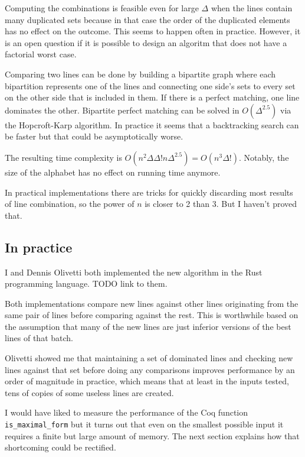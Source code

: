 \documentclass[english, 12pt, a4paper, sci, a-1b, online]{aaltothesis}
\newcommand\icoq[1]{\texttt{#1}}
\begin{document}
Computing the combinations is feasible even for large $\Delta$ when the lines contain many duplicated sets because in that case the order of the duplicated elements has no effect on the outcome. This seems to happen often in practice. However, it is an open question if it is possible to design an algoritm that does not have a factorial worst case.

Comparing two lines can be done by building a bipartite graph where each bipartition represents one of the lines and connecting one side's sets to every set on the other side that is included in them. If there is a perfect matching, one line dominates the other. Bipartite perfect matching can be solved in $O(\Delta^{2.5})$ via the Hopcroft-Karp algorithm. In practice it seems that a backtracking search can be faster but that could be asymptotically worse.

The resulting time complexity is $O(n^2\Delta\Delta!n\Delta^{2.5}) = O(n^3\Delta!)$. Notably, the size of the alphabet has no effect on running time anymore.

In practical implementations there are tricks for quickly discarding most results of line combination, so the power of $n$ is closer to 2 than 3. But I haven't proved that.

\subsection{In practice}

I and Dennis Olivetti both implemented the new algorithm in the Rust programming language. TODO link to them.

Both implementations compare new lines against other lines originating from the same pair of lines before comparing against the rest. This is worthwhile based on the assumption that many of the new lines are just inferior versions of the best lines of that batch.

Olivetti showed me that maintaining a set of dominated lines and checking new lines against that set before doing any comparisons improves performance by an order of magnitude in practice, which means that at least in the inputs tested, tens of copies of some useless lines are created.

I would have liked to measure the performance of the Coq function \icoq{is_maximal_form} but it turns out that even on the smallest possible input it requires a finite but large amount of memory. The next section explains how that shortcoming could be rectified.
\end{document}

